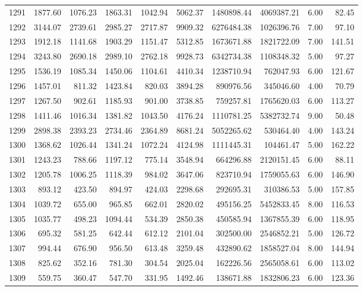 \begin{tabular}{lrrrrrrrrr}
1291 & 1877.60 & 1076.23 & 1863.31 & 1042.94 & 5062.37 & 1480898.44 & 4069387.21 & 6.00 & 82.45 \\
1292 & 3144.07 & 2739.61 & 2985.27 & 2717.87 & 9909.32 & 6276484.38 & 1026396.76 & 7.00 & 97.10 \\
1293 & 1912.18 & 1141.68 & 1903.29 & 1151.47 & 5312.85 & 1673671.88 & 1821722.09 & 7.00 & 141.51 \\
1294 & 3243.80 & 2690.18 & 2989.10 & 2762.18 & 9928.73 & 6342734.38 & 1108348.32 & 5.00 & 97.27 \\
1295 & 1536.19 & 1085.34 & 1450.06 & 1104.61 & 4410.34 & 1238710.94 & 762047.93 & 6.00 & 121.67 \\
1296 & 1457.01 & 811.32 & 1423.84 & 820.03 & 3894.28 & 890976.56 & 345046.60 & 4.00 & 70.79 \\
1297 & 1267.50 & 902.61 & 1185.93 & 901.00 & 3738.85 & 759257.81 & 1765620.03 & 6.00 & 113.27 \\
1298 & 1411.46 & 1016.34 & 1381.82 & 1043.50 & 4176.24 & 1110781.25 & 5382732.74 & 9.00 & 50.48 \\
1299 & 2898.38 & 2393.23 & 2734.46 & 2364.89 & 8681.24 & 5052265.62 & 530464.40 & 4.00 & 143.24 \\
1300 & 1368.62 & 1026.44 & 1341.24 & 1072.24 & 4124.98 & 1111445.31 & 104461.47 & 5.00 & 162.22 \\
1301 & 1243.23 & 788.66 & 1197.12 & 775.14 & 3548.94 & 664296.88 & 2120151.45 & 6.00 & 88.11 \\
1302 & 1205.78 & 1006.25 & 1118.39 & 984.02 & 3647.06 & 823710.94 & 1759055.63 & 6.00 & 146.90 \\
1303 & 893.12 & 423.50 & 894.97 & 424.03 & 2298.68 & 292695.31 & 310386.53 & 5.00 & 157.85 \\
1304 & 1039.72 & 655.00 & 965.85 & 662.01 & 2820.02 & 495156.25 & 5452833.45 & 8.00 & 116.53 \\
1305 & 1035.77 & 498.23 & 1094.44 & 534.39 & 2850.38 & 450585.94 & 1367855.39 & 6.00 & 118.95 \\
1306 & 695.32 & 581.25 & 642.44 & 612.12 & 2101.04 & 302500.00 & 2546852.21 & 5.00 & 126.72 \\
1307 & 994.44 & 676.90 & 956.50 & 613.48 & 3259.48 & 432890.62 & 1858527.04 & 8.00 & 144.94 \\
1308 & 825.62 & 352.16 & 781.30 & 304.54 & 2025.04 & 162226.56 & 2565058.61 & 6.00 & 113.02 \\
1309 & 559.75 & 360.47 & 547.70 & 331.95 & 1492.46 & 138671.88 & 1832806.23 & 6.00 & 123.36 \\

\end{tabular}
